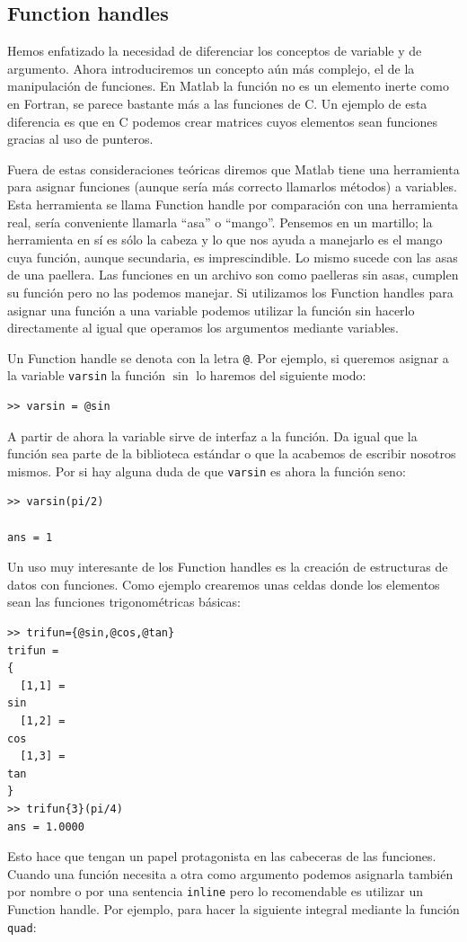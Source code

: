 \subsection{Function handles}

Hemos enfatizado la necesidad de diferenciar los conceptos de
variable y de argumento. Ahora introduciremos un concepto aún más
complejo, el de la manipulación de funciones. En Matlab la función no
es un elemento inerte como en Fortran, se parece bastante más a las
funciones de C. Un ejemplo de esta diferencia es que en C podemos
crear matrices cuyos elementos sean funciones gracias al uso de
punteros.

Fuera de estas consideraciones teóricas diremos que Matlab tiene una
herramienta para asignar funciones (aunque sería más correcto
llamarlos métodos) a variables. Esta herramienta se llama Function
handle por comparación con una herramienta real, sería conveniente
llamarla {}``asa'' o {}``mango''. Pensemos en un martillo; la
herramienta en sí es sólo la cabeza y lo que nos ayuda a manejarlo es
el mango cuya función, aunque secundaria, es imprescindible. Lo mismo
sucede con las asas de una paellera. Las funciones en un archivo son
como paelleras sin asas, cumplen su función pero no las podemos
manejar. Si utilizamos los Function handles para asignar una función a
una variable podemos utilizar la función sin hacerlo directamente al
igual que operamos los argumentos mediante variables.

Un Function handle se denota con la letra \texttt{@}. Por ejemplo, si
queremos asignar a la variable \texttt{varsin} la función $\sin$ lo
haremos del siguiente modo:

\begin{lstlisting}
>> varsin = @sin
\end{lstlisting}
A partir de ahora la variable sirve de interfaz a la función. Da igual
que la función sea parte de la biblioteca estándar o que la acabemos
de escribir nosotros mismos. Por si hay alguna duda de que
\texttt{varsin} es ahora la función seno:

\begin{lstlisting}
>> varsin(pi/2)

ans = 1
\end{lstlisting}
Un uso muy interesante de los Function handles es la creación de
estructuras de datos con funciones. Como ejemplo crearemos unas celdas
donde los elementos sean las funciones trigonométricas básicas:

\begin{lstlisting}
>> trifun={@sin,@cos,@tan}
trifun =
{
  [1,1] =
sin
  [1,2] =
cos
  [1,3] =
tan
}
>> trifun{3}(pi/4)
ans = 1.0000
\end{lstlisting}
Esto hace que tengan un papel protagonista en las cabeceras de las
funciones. Cuando una función necesita a otra como argumento podemos
asignarla también por nombre o por una sentencia \texttt{inline} pero
lo recomendable es utilizar un Function handle. Por ejemplo, para
hacer la siguiente integral mediante la función \texttt{quad}:

